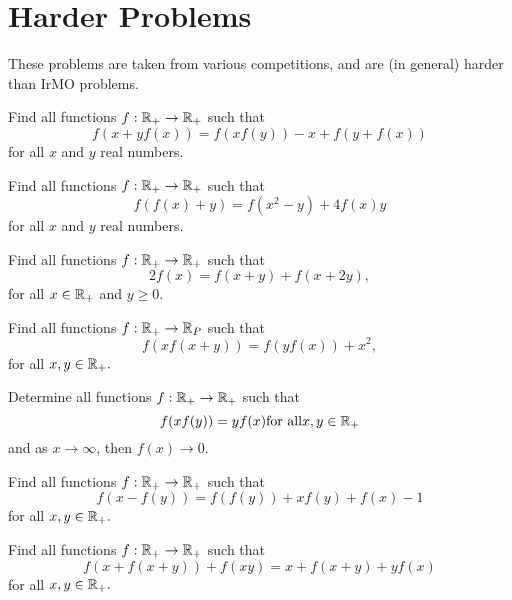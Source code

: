 \documentclass{pset}
\begin{document}
\section*{Harder Problems}

These problems are taken from various competitions, and are (in general)
harder than IrMO problems.

\begin{problems}
    
\begin{problem}Find all functions $f: \R_+\to \R_+$ such that
$$f(x+yf(x))=f(x f(y))-x+f(y+f(x))  $$
for all $x$ and $y$ real numbers.
\end{problem}
 
\begin{problem}Find all functions $f: \R_+\to \R_+$ such that
$$f(f(x)+y)=f(x^2-y)+4f(x)y  $$
for all $x$ and $y$ real numbers.
\end{problem}

\begin{problem} Find all functions $f: \R_+ \to \R_+$ such that
$$2f(x)=f(x+y)+f(x+2y), $$
for all $x\in \R_+$ and $y\geq 0$.

\end{problem}


\begin{problem}[IMO SL 2009] Find all functions $f : \R_+ \to \R_P$ such that
$$ f(xf(x + y)) = f(yf(x)) + x^2,$$
for all $x, y \in \R_+.$

\end{problem}

\begin{problem}[IMO SL 1993] Determine all functions $f : \R_+ \to \R_+$
such that
$$f(xf(y)) = yf(x) \mbox{for all} x, y  \in \R_+$$ and as $x \to \infty$, then $f(x) \to 0$.
\end{problem}

\begin{problem}[IMO 1999] Find all functions $f : \R_+ \to \R_+$ such that
$$f(x - f(y)) = f(f(y)) + xf(y) + f(x) - 1$$
for all $x, y \in \R_+.$
\end{problem}


\begin{problem}[IMO 1999] Find all functions $f : \R_+ \to \R_+$ such that
$$f(x + f(x + y))+ f(xy) = x + f(x + y) + yf(x) $$
for all $x, y \in \R_+.$
\end{problem}
    

\end{problems}
\end{document}

